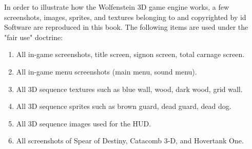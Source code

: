 In order to illustrate how the Wolfenstein 3D game engine works, a few screenshots, images, sprites, and textures belonging to and copyrighted by id Software are reproduced in this book. The following items are used under the "fair use" doctrine:\\
\par
\begin{enumerate}
	\item All in-game screenshots, title screen, signon screen, total carnage screen.
	\item All in-game menu screenshots (main menu, sound menu).
	\item All 3D sequence textures such as blue wall, wood, dark wood, grid wall.
    \item All 3D sequence sprites such as brown guard, dead guard, dead dog.
    \item All 3D sequence images used for the HUD.
    \item All screenshots of Spear of Destiny, Catacomb 3-D, and Hovertank One.
\end{enumerate}
